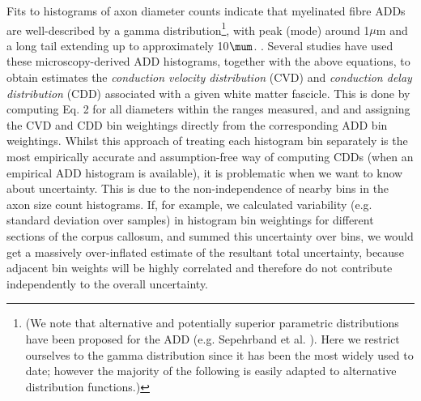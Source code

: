
Fits to histograms of axon diameter counts indicate that myelinated fibre ADDs are well-described by a gamma distribution\footnote{(We note that alternative and potentially superior parametric distributions have been proposed for the ADD (e.g. Sepehrband et al. \citep{sepehrband2016parametric}). Here we restrict ourselves to the gamma distribution since it has been the most widely used to date; however the majority of the following is easily adapted to alternative distribution functions.)}, with peak (mode) around 1$\mu$m and a long tail extending up to approximately 10$\mum$. \citep{aboitiz1992fiber}. Several studies have used these microscopy-derived ADD histograms, together with the above equations, to obtain estimates the \textit{conduction velocity distribution} (CVD) and \textit{conduction delay distribution} (CDD) associated with a given white matter fascicle. This is done by computing Eq. 2 for all diameters within the ranges measured, and and assigning the CVD and CDD bin weightings directly from the corresponding ADD bin weightings. Whilst this approach of treating each histogram bin separately is the most empirically accurate and assumption-free way of computing CDDs (when an empirical ADD histogram is available), it is problematic when we want to know about uncertainty. This is due to the non-independence of nearby bins in the axon size count histograms. If, for example, we calculated variability (e.g. standard deviation over samples) in histogram bin weightings for different sections of the corpus callosum, and summed this uncertainty over bins, we would get a massively over-inflated estimate of the resultant total uncertainty, because adjacent bin weights will be highly correlated and therefore do not contribute independently to the overall uncertainty. 
